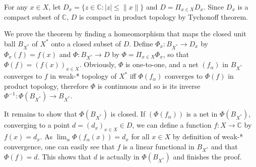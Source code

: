 \documentclass[12pt]{article}
\begin{document}
For any $x\in X$, let $D_x=\{z\in\mathbb{C}: |z|\leq \|x\|\}$ and $D=\Pi_{x\in X} D_x$. Since $D_x$ is a compact subset of $\mathbb{C}$, $D$ is compact in product topology by Tychonoff theorem.

We prove the theorem by finding a homeomorphism that maps the closed unit ball 
$B_{X^*}$ of $X^*$ onto a closed subset of $D$. Define $\Phi_x:B_{X^*}\to D_x$ by 
$\Phi_x(f)=f(x)$ and $\Phi:B_{X^*}\to D$ by $\Phi=\Pi_{x\in X}\Phi_x$, so that
$\Phi(f)=(f(x))_{x\in X}$. Obviously, $\Phi$ is one-to-one, and a net $(f_\alpha)$ in $B_{X^*}$ converges to $f$ in weak-* topology of $X^*$ iff $\Phi(f_\alpha)$ converges to $\Phi(f)$ in product topology, therefore $\Phi$ is continuous and so is its inverse $\Phi^{-1}:\Phi(B_{X^*})\to B_{X^*}$.

It remains to show that $\Phi(B_{X^*})$ is closed. If $(\Phi(f_\alpha))$ is a net
in $\Phi(B_{X^*})$, converging to a point $d=(d_x)_{x\in X}\in D$, we can define a function
$f:X\to \mathbb{C}$ by $f(x)=d_x$. As $\lim_\alpha \Phi(f_\alpha(x))=d_x$ for all $x\in X$ by definition of weak-* convergence, one can easily see that $f$ is a linear functional in $B_{X^*}$ and that $\Phi(f)=d$. This shows that $d$ is actually in $\Phi(B_{X^*})$ and finishes the proof.
\end{document}

